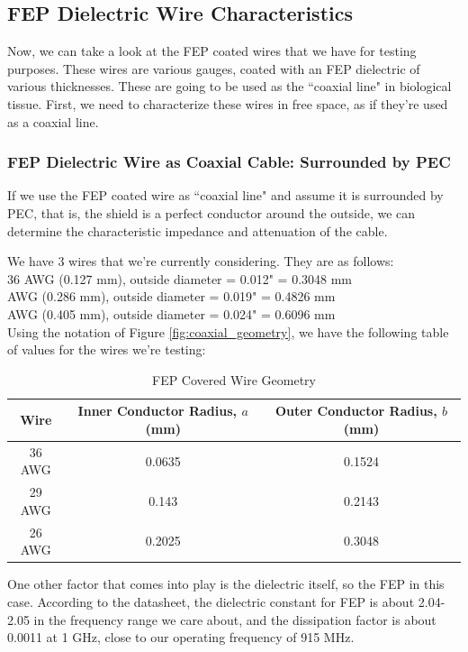 \documentclass[12pt,onecolumn,titlepage]{article}
\begin{document}
\subsection{FEP Dielectric Wire Characteristics}
\indent \indent Now, we can take a look at the FEP coated wires that we have for testing purposes. These wires are various gauges, coated with an FEP dielectric of various thicknesses. These are going to be used as the ``coaxial line" in biological tissue. First, we need to characterize these wires in free space, as if they're used as a coaxial line.

\subsubsection{FEP Dielectric Wire as Coaxial Cable: Surrounded by PEC}
\indent \indent If we use the FEP coated wire as ``coaxial line" and assume it is surrounded by PEC, that is, the shield is a perfect conductor around the outside, we can determine the characteristic impedance and attenuation of the cable. 

We have 3 wires that we're currently considering. They are as follows: \\

36 AWG (0.127 mm), outside diameter = 0.012" = 0.3048 mm \\
 AWG (0.286 mm), outside diameter = 0.019" = 0.4826 mm \\
 AWG (0.405 mm), outside diameter = 0.024" = 0.6096 mm \\

Using the notation of Figure \ref{fig:coaxial_geometry}, we have the following table of values for the wires we're testing:

\begin{table}[h!]
\centering
	\caption{FEP Covered Wire Geometry}
	\begin{tabular}{| c | c | c |}
	\hline
	 Wire & Inner Conductor Radius, $a$ (mm) & Outer Conductor Radius, $b$ (mm) \\ \hline
	 36 AWG & 0.0635 & 0.1524 \\ \hline
	 29 AWG & 0.143 & 0.2143 \\ \hline
	 26 AWG & 0.2025 & 0.3048 \\ \hline
	 \end{tabular}
\label{tab:FEP_geometry}
\end{table}

One other factor that comes into play is the dielectric itself, so the FEP in this case. According to the datasheet, the dielectric constant for FEP is about 2.04-2.05 in the frequency range we care about, and the dissipation factor is about 0.0011 at 1 GHz, close to our operating frequency of 915 MHz. 
\end{document}
